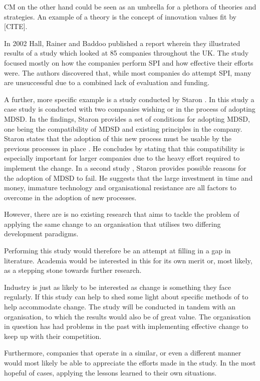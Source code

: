 \documentclass[times, 10pt,twocolumn]{IEEEtran}
\begin{document}
CM on the other hand could be seen as an umbrella for a plethora of theories and strategies. An example of a theory is the concept of innovation values fit by [CITE].

In 2002 Hall, Rainer and Baddoo \cite{hall2002implementing} published a report wherein they illustrated results of a study which looked at 85 companies throughout the UK. The study focused mostly on how the companies perform SPI and how effective their efforts were. The authors discovered that, while most companies do attempt SPI, many are unsuccessful due to a combined lack of evaluation and funding.

A further, more specific example is a study conducted by Staron \cite{staron2006adopting}. In this study a case study is conducted with two companies wishing or in the process of adopting MDSD. In the findings, Staron provides a set of conditions for adopting MDSD, one being the compatibility of MDSD and existing principles in the company. Staron states that the adoption of this new process must be usable by the previous processes in place \cite{staron2006adopting}. He concludes by stating that this compatibility is especially important for larger companies due to the heavy effort required to implement the change. In a second study \cite{staron2008transitioning}, Staron provides possible reasons for the adoption of MDSD to fail. He suggests that the large investment in time and money, immature technology and organisational resistance are all factors to overcome in the adoption of new processes.

However, there are is no existing research that aims to tackle the problem of applying the same change to an organisation that utilises two differing development paradigms.

Performing this study would therefore be an attempt at filling in a gap in literature. Academia would be interested in this for its own merit or, most likely, as a stepping stone towards further research.

Industry is just as likely to be interested as change is something they face regularly. If this study can help to shed some light about specific methods of to help accommodate change. The study will be conducted in tandem with an organisation, to which the results would also be of great value. The organisation in question has had problems in the past with implementing effective change to keep up with their competition. 

Furthermore, companies that operate in a similar, or even a different manner would most likely be able to appreciate the efforts made in the study. In the most hopeful of cases, applying the lessons learned to their own situations.
\end{document}

